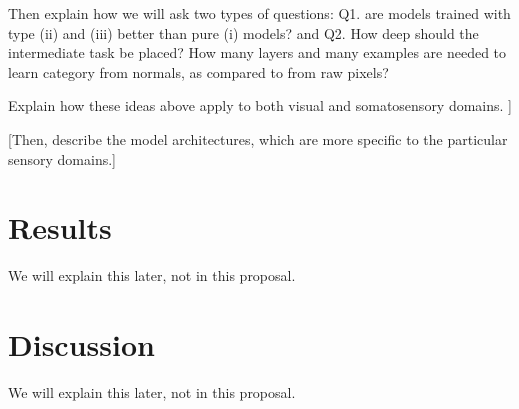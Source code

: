 \documentclass[12pt]{article}
\begin{document}
Then explain how we will ask two types of questions: Q1.  are models trained with type (ii) and (iii) better than pure (i) models?  and Q2. How deep should the intermediate task be placed?  How many layers and many examples are needed to learn category from normals, as compared to from raw pixels?

Explain how these ideas above apply to both visual and somatosensory domains.
]

[Then, describe the model architectures, which are more specific to the particular sensory domains.]

\section*{Results}

We will explain this later, not in this proposal.

\section*{Discussion}

We will explain this later, not in this proposal.



%
%

\end{document}
